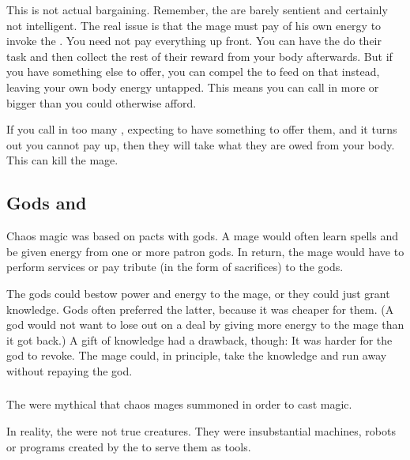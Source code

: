 This is not actual bargaining. 
Remember, the \daemons{} are barely sentient and certainly not intelligent. 
The real issue is that the mage must pay of his own energy to invoke the \daemons. 
You need not pay everything up front. 
You can have the \daemons{} do their task and then collect the rest of their reward from your body afterwards. 
But if you have something else to offer, you can compel the \daemons{} to feed on that instead, leaving your own body energy untapped. 
This means you can call in more or bigger \daemons{} than you could otherwise afford. 

If you call in too many \daemons, expecting to have something to offer them, and it turns out you cannot pay up, then they will take what they are owed from your body. 
This can kill the mage. 









\subsection{Gods and \daemons}
Chaos magic was based on pacts with gods. 
A mage would often learn spells and be given energy from one or more patron gods. 
In return, the mage would have to perform services or pay tribute (in the form of sacrifices) to the gods. 

The gods could bestow power and energy to the mage, or they could just grant knowledge.
Gods often preferred the latter, because it was cheaper for them.
(A god would not want to lose out on a deal by giving more energy to the mage than it got back.)
A gift of knowledge had a drawback, though: 
It was harder for the god to revoke. 
The mage could, in principle, take the knowledge and run away without repaying the god. 









\subsubsection{\Daemons}
The \daemons were mythical  that chaos mages summoned in order to cast magic. 

In reality, the \daemons were not true creatures.
They were insubstantial machines, robots or programs created by the \xss to serve them as tools. 

